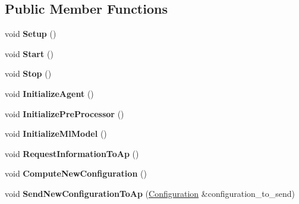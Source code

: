\subsection*{Public Member Functions}
\begin{DoxyCompactItemize}
\item 
\mbox{\label{classcompcxx__Agent__25_a3ec14b5b6a2cd192de9b2ce367f3f6d9}} 
void {\bfseries Setup} ()
\item 
\mbox{\label{classcompcxx__Agent__25_a6f110202e6343a30b286f3c1ab7f056c}} 
void {\bfseries Start} ()
\item 
\mbox{\label{classcompcxx__Agent__25_a5b97e82bc95b4a40a1ac771e5aa828f0}} 
void {\bfseries Stop} ()
\item 
\mbox{\label{classcompcxx__Agent__25_a063e3f7f45e930741172376b26e3e748}} 
void {\bfseries Initialize\+Agent} ()
\item 
\mbox{\label{classcompcxx__Agent__25_ac6892ce3eef81f340d30bb58a0d4b393}} 
void {\bfseries Initialize\+Pre\+Processor} ()
\item 
\mbox{\label{classcompcxx__Agent__25_ae732e92ffff2bc34d93c15d77fb23b97}} 
void {\bfseries Initialize\+Ml\+Model} ()
\item 
\mbox{\label{classcompcxx__Agent__25_ad8d476c02b12c6f216d309be2f0716bc}} 
void {\bfseries Request\+Information\+To\+Ap} ()
\item 
\mbox{\label{classcompcxx__Agent__25_a3bf9618e57b14c8f3301bc1ce9f127b0}} 
void {\bfseries Compute\+New\+Configuration} ()
\item 
\mbox{\label{classcompcxx__Agent__25_a68025881fe2f2f5a908b471810885dee}} 
void {\bfseries Send\+New\+Configuration\+To\+Ap} (\hyperlink{structConfiguration}{Configuration} \&configuration\+\_\+to\+\_\+send)
\item 
\mbox{\label{classcompcxx__Agent__25_ac0b2cfb425ed43ae5ff4e603e69addd7}} 

\end{DoxyCompactItemize}

